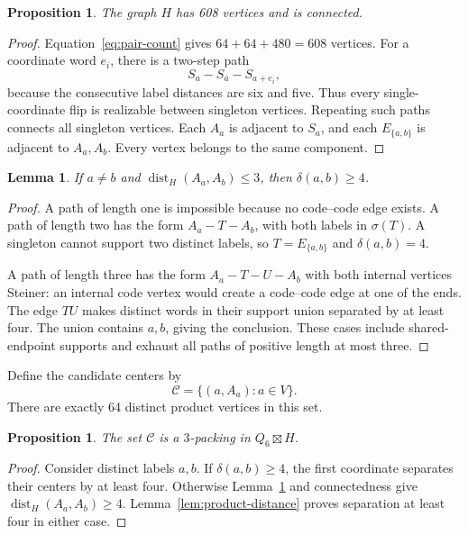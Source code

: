 \documentclass[11pt]{article}
\newtheorem{lemma}[theorem]{Lemma}
\newtheorem{proposition}[theorem]{Proposition}
\theoremstyle{definition}
\theoremstyle{remark}
\newcommand{\dist}{\operatorname{dist}}
\newcommand{\code}{\mathcal C}
\begin{document}
\begin{proposition}\label{prop:H-connected}
The graph \(H\) has 608 vertices and is connected.
\end{proposition}
\begin{proof}
Equation~\eqref{eq:pair-count} gives \(64+64+480=608\) vertices.
For a coordinate word \(e_i\), there is a two-step path
\[
 S_a-S_{\bar a}-S_{a+e_i},
\]
because the consecutive label distances are six and five.
Thus every single-coordinate flip is realizable between singleton
vertices. Repeating such paths connects all singleton vertices.
Each \(A_a\) is adjacent to \(S_a\), and each \(E_{\{a,b\}}\) is
adjacent to \(A_a,A_b\). Every vertex belongs to the same component.
\end{proof}

\begin{lemma}\label{lem:short-path}
If \(a\ne b\) and \(\dist_H(A_a,A_b)\le3\), then \(\delta(a,b)\ge4\).
\end{lemma}
\begin{proof}
A path of length one is impossible because no code--code edge exists.
A path of length two has the form \(A_a-T-A_b\), with both labels
in \(\sigma(T)\). A singleton cannot support two distinct labels,
so \(T=E_{\{a,b\}}\) and \(\delta(a,b)=4\).

A path of length three has the form \(A_a-T-U-A_b\) with both
internal vertices Steiner: an internal code vertex would create
a code--code edge at one of the ends. The edge \(TU\) makes distinct
words in their support union separated by at least four. The union
contains \(a,b\), giving the conclusion. These cases include
shared-endpoint supports and exhaust all paths of positive length
at most three.
\end{proof}

Define the candidate centers by
\begin{equation}\label{eq:centers}
 \code=\{(a,A_a):a\in V\}.
\end{equation}
There are exactly 64 distinct product vertices in this set.

\begin{proposition}\label{prop:packing}
The set \(\code\) is a \(3\)-packing in \(Q_6\boxtimes H\).
\end{proposition}
\begin{proof}
Consider distinct labels \(a,b\). If \(\delta(a,b)\ge4\), the first
coordinate separates their centers by at least four. Otherwise
Lemma~\ref{lem:short-path} and connectedness give
\(\dist_H(A_a,A_b)\ge4\). Lemma~\ref{lem:product-distance}
proves separation at least four in either case.
\end{proof}
\end{document}

